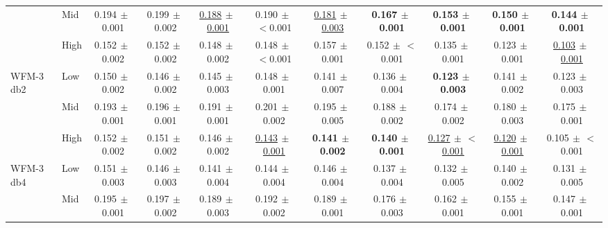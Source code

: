 \begin{table}[ht]
{\begin{tabular}{llccccccccc}
 & Mid & 0.194{\scriptsize$\,\pm\,$0.001} & 0.199{\scriptsize$\,\pm\,$0.002} & \underline{0.188{\scriptsize$\,\pm\,$0.001}} & 0.190{\scriptsize$\,\pm\,$$<$0.001} & \underline{0.181{\scriptsize$\,\pm\,$0.003}} & \textbf{0.167{\scriptsize$\,\pm\,$0.001}} & \textbf{0.153{\scriptsize$\,\pm\,$0.001}} & \textbf{0.150{\scriptsize$\,\pm\,$0.001}} & \textbf{0.144{\scriptsize$\,\pm\,$0.001}} \\
 & High & 0.152{\scriptsize$\,\pm\,$0.002} & 0.152{\scriptsize$\,\pm\,$0.002} & 0.148{\scriptsize$\,\pm\,$0.002} & 0.148{\scriptsize$\,\pm\,$$<$0.001} & 0.157{\scriptsize$\,\pm\,$0.001} & 0.152{\scriptsize$\,\pm\,$$<$0.001} & 0.135{\scriptsize$\,\pm\,$0.001} & 0.123{\scriptsize$\,\pm\,$0.001} & \underline{0.103{\scriptsize$\,\pm\,$0.001}} \\
\midrule
\multirow{3}{*}{WFM-3 db2} & Low & 0.150{\scriptsize$\,\pm\,$0.002} & 0.146{\scriptsize$\,\pm\,$0.002} & 0.145{\scriptsize$\,\pm\,$0.003} & 0.148{\scriptsize$\,\pm\,$0.001} & 0.141{\scriptsize$\,\pm\,$0.007} & 0.136{\scriptsize$\,\pm\,$0.004} & \textbf{0.123{\scriptsize$\,\pm\,$0.003}} & 0.141{\scriptsize$\,\pm\,$0.002} & 0.123{\scriptsize$\,\pm\,$0.003} \\
 & Mid & 0.193{\scriptsize$\,\pm\,$0.001} & 0.196{\scriptsize$\,\pm\,$0.001} & 0.191{\scriptsize$\,\pm\,$0.001} & 0.201{\scriptsize$\,\pm\,$0.002} & 0.195{\scriptsize$\,\pm\,$0.005} & 0.188{\scriptsize$\,\pm\,$0.002} & 0.174{\scriptsize$\,\pm\,$0.002} & 0.180{\scriptsize$\,\pm\,$0.003} & 0.175{\scriptsize$\,\pm\,$0.001} \\
 & High & 0.152{\scriptsize$\,\pm\,$0.002} & 0.151{\scriptsize$\,\pm\,$0.002} & 0.146{\scriptsize$\,\pm\,$0.002} & \underline{0.143{\scriptsize$\,\pm\,$0.001}} & \textbf{0.141{\scriptsize$\,\pm\,$0.002}} & \textbf{0.140{\scriptsize$\,\pm\,$0.001}} & \underline{0.127{\scriptsize$\,\pm\,$$<$0.001}} & \underline{0.120{\scriptsize$\,\pm\,$0.001}} & 0.105{\scriptsize$\,\pm\,$$<$0.001} \\
\midrule
\multirow{3}{*}{WFM-3 db4} & Low & 0.151{\scriptsize$\,\pm\,$0.003} & 0.146{\scriptsize$\,\pm\,$0.003} & 0.141{\scriptsize$\,\pm\,$0.004} & 0.144{\scriptsize$\,\pm\,$0.004} & 0.146{\scriptsize$\,\pm\,$0.004} & 0.137{\scriptsize$\,\pm\,$0.004} & 0.132{\scriptsize$\,\pm\,$0.005} & 0.140{\scriptsize$\,\pm\,$0.002} & 0.131{\scriptsize$\,\pm\,$0.005} \\
 & Mid & 0.195{\scriptsize$\,\pm\,$0.001} & 0.197{\scriptsize$\,\pm\,$0.002} & 0.189{\scriptsize$\,\pm\,$0.003} & 0.192{\scriptsize$\,\pm\,$0.002} & 0.189{\scriptsize$\,\pm\,$0.001} & 0.176{\scriptsize$\,\pm\,$0.003} & 0.162{\scriptsize$\,\pm\,$0.001} & 0.155{\scriptsize$\,\pm\,$0.001} & 0.147{\scriptsize$\,\pm\,$0.001} \\

\end{tabular}}
\end{table}
